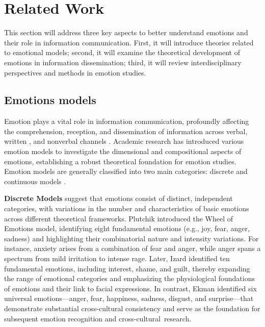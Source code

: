 \section{Related Work}
This section will address three key aspects to better understand emotions and their role in information communication. First, it will introduce theories related to emotional models; second, it will examine the theoretical development of emotions in information dissemination; third, it will review interdisciplinary perspectives and methods in emotion studies. 

\subsection{Emotions models} \label{sec:emotion_models}
Emotion plays a vital role in information communication, profoundly affecting the comprehension, reception, and dissemination of information across verbal\cite{bestelmeyer2017effects, gobl2003role, weinstein2018you}, written \cite{mar2011emotion, jaaskelainen2020neural, lekkas2022using, panksepp2012archeology}, and nonverbal channels \cite{jonauskaite2019color, kallabis2024investigating, thumfart2008modeling, wei2006image, mayer2014benefits, ferrara2015measuring, hanson2014happy, xie2017negative, van2015good, pfeuffer122measuring}. Academic research has introduced various emotion models to investigate the dimensional and compositional aspects of emotions, establishing a robust theoretical foundation for emotion studies. Emotion models are generally classified into two main categories: discrete \cite{plutchik1980general, izard1991psychology, ekman1992argument} and continuous models \cite{russell1980circumplex, mehrabian1974approach, osgood1952nature}.


\textbf{Discrete Models} suggest that emotions consist of distinct, independent categories, with variations in the number and characteristics of basic emotions across different theoretical frameworks. Plutchik \cite{plutchik1980general} introduced the Wheel of Emotions model, identifying eight fundamental emotions (e.g., joy, fear, anger, sadness) and highlighting their combinatorial nature and intensity variations. For instance, anxiety arises from a combination of fear and anger, while anger spans a spectrum from mild irritation to intense rage. Later, Izard \cite{izard1991psychology} identified ten fundamental emotions, including interest, shame, and guilt, thereby expanding the range of emotional categories and emphasizing the physiological foundations of emotions and their link to facial expressions. In contrast, Ekman \cite{ekman1992argument} identified six universal emotions—anger, fear, happiness, sadness, disgust, and surprise—that demonstrate substantial cross-cultural consistency and serve as the foundation for subsequent emotion recognition and cross-cultural~research.

